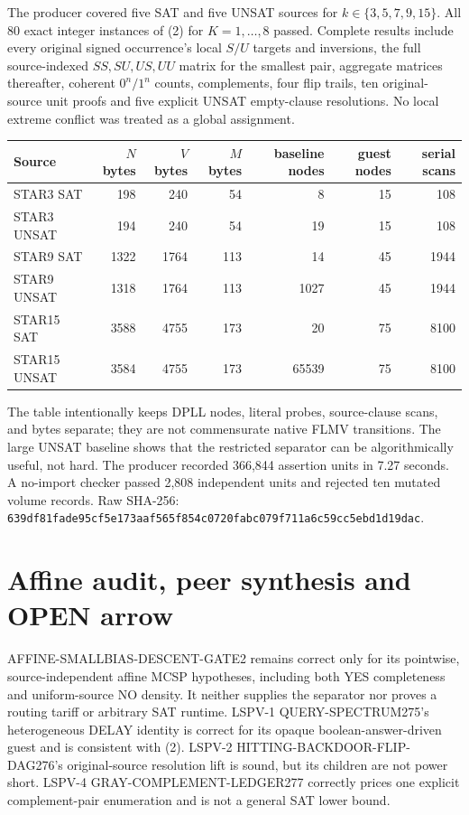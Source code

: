 \documentclass[11pt]{article}
\begin{document}
The producer covered five SAT and five UNSAT sources for
$k\in\{3,5,7,9,15\}$.  All 80 exact integer instances of (2) for
$K=1,\ldots,8$ passed.  Complete results include every original signed
occurrence's local $S/U$ targets and inversions, the full source-indexed
$SS,SU,US,UU$ matrix for the smallest pair, aggregate matrices thereafter,
coherent $0^n/1^n$ counts, complements, four flip trails, ten original-source
unit proofs and five explicit UNSAT empty-clause resolutions.  No local
extreme conflict was treated as a global assignment.

\begin{center}\small
\begin{tabular}{lrrrrrr}
\toprule
Source & $N$ bytes & $V$ bytes & $M$ bytes & baseline nodes & guest nodes & serial scans\\\midrule
STAR3 SAT&198&240&54&8&15&108\\
STAR3 UNSAT&194&240&54&19&15&108\\
STAR9 SAT&1322&1764&113&14&45&1944\\
STAR9 UNSAT&1318&1764&113&1027&45&1944\\
STAR15 SAT&3588&4755&173&20&75&8100\\
STAR15 UNSAT&3584&4755&173&65539&75&8100\\
\bottomrule
\end{tabular}
\end{center}
The table intentionally keeps DPLL nodes, literal probes, source-clause scans,
and bytes separate; they are not commensurate native FLMV transitions.  The
large UNSAT baseline shows that the restricted separator can be algorithmically
useful, not hard.  The producer recorded 366,844 assertion units in 7.27
seconds.  A no-import checker passed 2,808 independent units and rejected ten
mutated volume records.  Raw SHA-256:
\texttt{639df81fade95cf5e173aaf565f854c0720fabc079f711a6c59cc5ebd1d19dac}.

\section{Affine audit, peer synthesis and OPEN arrow}
AFFINE-SMALLBIAS-DESCENT-GATE2 remains correct only for its pointwise,
source-independent affine MCSP hypotheses, including both YES completeness and
uniform-source NO density.  It neither supplies the separator nor proves a
routing tariff or arbitrary SAT runtime.  LSPV-1 QUERY-SPECTRUM275's
heterogeneous DELAY identity is correct for its opaque boolean-answer-driven
guest and is consistent with (2).  LSPV-2 HITTING-BACKDOOR-FLIP-DAG276's
original-source resolution lift is sound, but its children are not power
short.  LSPV-4 GRAY-COMPLEMENT-LEDGER277 correctly prices one explicit
complement-pair enumeration and is not a general SAT lower bound.
\end{document}
